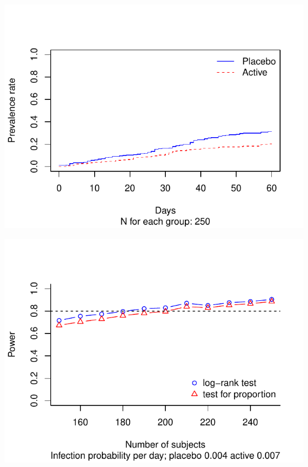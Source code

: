 \documentclass[jss]{jss}
\begin{document}
\begin{CodeChunk}


\begin{center}\includegraphics{LKmodelJSS_files/figure-latex/power-1} \end{center}



\begin{center}\includegraphics{LKmodelJSS_files/figure-latex/power-2} \end{center}

\end{CodeChunk}
\end{document}
